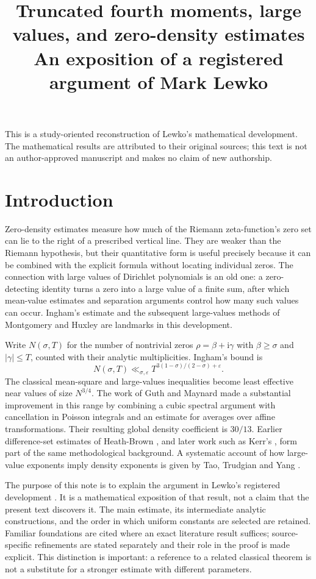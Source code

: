 \documentclass[11pt,a4paper,oneside]{article}
\title{Truncated fourth moments, large values, and zero-density estimates\\[3pt]\large An exposition of a registered argument of Mark Lewko}
\author{}
\date{}
\theoremstyle{definition}
\newcommand{\eps}{\varepsilon}
\newcommand{\ii}{\mathrm i}
\numberwithin{equation}{section}
\begin{document}
\maketitle
\begingroup\small\noindent
This is a study-oriented reconstruction of Lewko's mathematical development. The mathematical results are attributed to their original sources; this text is not an author-approved manuscript and makes no claim of new authorship.\par\endgroup
\section{Introduction}\label{sec:introduction}
Zero-density estimates measure how much of the Riemann zeta-function's zero set can lie to the right of a prescribed vertical line. They are weaker than the Riemann hypothesis, but their quantitative form is useful precisely because it can be combined with the explicit formula without locating individual zeros. The connection with large values of Dirichlet polynomials is an old one: a zero-detecting identity turns a zero into a large value of a finite sum, after which mean-value estimates and separation arguments control how many such values can occur. Ingham's estimate \cite{Ingham} and the subsequent large-values methods of Montgomery and Huxley \cite{Montgomery,Huxley} are landmarks in this development.

Write $N(\sigma,T)$ for the number of nontrivial zeros $\rho=\beta+\ii\gamma$ with $\beta\ge\sigma$ and $|\gamma|\le T$, counted with their analytic multiplicities. Ingham's bound is
\[
 N(\sigma,T)\ll_{\sigma,\eps}
 T^{3(1-\sigma)/(2-\sigma)+\eps}.
\]
The classical mean-square and large-values inequalities become least effective near values of size $N^{3/4}$. The work of Guth and Maynard \cite{GuthMaynard} made a substantial improvement in this range by combining a cubic spectral argument with cancellation in Poisson integrals and an estimate for averages over affine transformations. Their resulting global density coefficient is $30/13$. Earlier difference-set estimates of Heath-Brown \cite{HeathBrownLV}, and later work such as Kerr's \cite{Kerr}, form part of the same methodological background. A systematic account of how large-value exponents imply density exponents is given by Tao, Trudgian and Yang \cite{TaoTrudgianYang}.

The purpose of this note is to explain the argument in Lewko's registered development \cite{Lewko,Palomar}. It is a mathematical exposition of that result, not a claim that the present text discovers it. The main estimate, its intermediate analytic constructions, and the order in which uniform constants are selected are retained. Familiar foundations are cited where an exact literature result suffices; source-specific refinements are stated separately and their role in the proof is made explicit. This distinction is important: a reference to a related classical theorem is not a substitute for a stronger estimate with different parameters.
\end{document}
